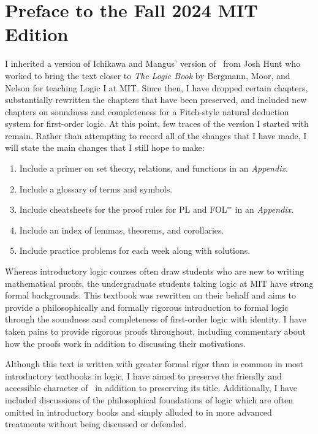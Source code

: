 
\chapter*{Preface to the Fall 2024 MIT Edition}
\label{ch.preface2}

I inherited a version of Ichikawa and Mangus' version of \forallx\ from Josh Hunt who worked to bring the text closer to \textit{The Logic Book} by Bergmann, Moor, and Nelson for teaching Logic I at MIT.
Since then, I have dropped certain chapters, substantially rewritten the chapters that have been preserved, and included new chapters on soundness and completeness for a Fitch-style natural deduction system for first-order logic.
At this point, few traces of the version I started with remain.
Rather than attempting to record all of the changes that I have made, I will state the main changes that I still hope to make:

  \begin{enumerate}
    \item Include a primer on set theory, relations, and functions in an \textit{Appendix}.
    \item Include a glossary of terms and symbols.
    \item Include cheatsheets for the proof rules for PL and FOL$^=$ in an \textit{Appendix}.
    \item Include an index of lemmas, theorems, and corollaries.
    \item Include practice problems for each week along with solutions.
  \end{enumerate}

Whereas introductory logic courses often draw students who are new to writing mathematical proofs, the undergraduate students taking logic at MIT have strong formal backgrounds.
This textbook was rewritten on their behalf and aims to provide a philosophically and formally rigorous introduction to formal logic through the soundness and completeness of first-order logic with identity.
I have taken pains to provide rigorous proofs throughout, including commentary about how the proofs work in addition to discussing their motivations.

Although this text is written with greater formal rigor than is common in most introductory textbooks in logic, I have aimed to preserve the friendly and accessible character of \forallx\ in addition to preserving its title.
Additionally, I have included discussions of the philosophical foundations of logic which are often omitted in introductory books and simply alluded to in more advanced treatments without being discussed or defended.

